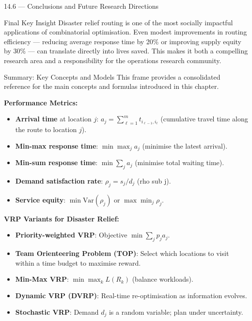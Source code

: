 \documentclass[aspectratio=169,10pt]{beamer}
\begin{document}
\begin{frame}[allowframebreaks]{14.6 --- Conclusions and Future Research Directions}
  \medskip
  \begin{alertblock}{Final Key Insight}
    Disaster relief routing is one of the most socially impactful
    applications of combinatorial optimisation.
    Even modest improvements in routing efficiency --- reducing
    average response time by 20\% or improving supply equity by 30\% ---
    can translate directly into lives saved.
    This makes it both a compelling research area and a responsibility
    for the operations research community.
  \end{alertblock}
\end{frame}

\begin{frame}[allowframebreaks]{Summary: Key Concepts and Models}
  This frame provides a consolidated reference for the main concepts
  and formulas introduced in this chapter.

  \medskip
  \textbf{Performance Metrics:}
  \begin{itemize}
    \item \textbf{Arrival time} at location $j$:
          $a_j = \sum_{\ell=1}^{m} t_{i_{\ell-1}, i_\ell}$
          (cumulative travel time along the route to location $j$).
    \item \textbf{Min-max response time}: $\min \max_j a_j$
          (minimise the latest arrival).
    \item \textbf{Min-sum response time}: $\min \sum_j a_j$
          (minimise total waiting time).
    \item \textbf{Demand satisfaction rate}:
          $\rho_j = s_j / d_j$ (rho sub j).
    \item \textbf{Service equity}:
          $\min \text{Var}(\rho_j)$ or $\max \min_j \rho_j$.
  \end{itemize}

  \medskip
  \textbf{VRP Variants for Disaster Relief:}
  \begin{itemize}
    \item \textbf{Priority-weighted VRP}: Objective $\min \sum_j p_j a_j$.
    \item \textbf{Team Orienteering Problem (TOP)}: Select which
          locations to visit within a time budget to maximise reward.
    \item \textbf{Min-Max VRP}: $\min \max_k L(R_k)$ (balance workloads).
    \item \textbf{Dynamic VRP (DVRP)}: Real-time re-optimisation as
          information evolves.
    \item \textbf{Stochastic VRP}: Demand $d_j$ is a random variable;
          plan under uncertainty.
  \end{itemize}


\end{frame}
\end{document}

